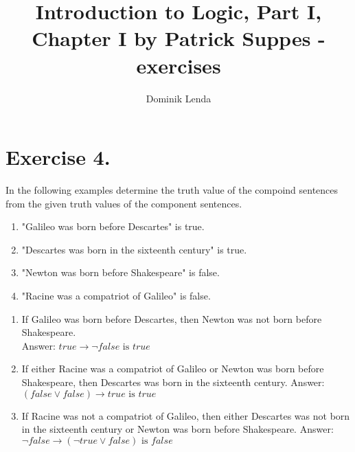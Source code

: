 \documentclass{article}
\title{Introduction to Logic, Part I, Chapter I by Patrick Suppes - exercises}
\author{Dominik Lenda}
\begin{document}
\maketitle

\section*{Exercise 4.}
In the following examples determine the truth value of the compoind sentences from the given truth values of the component sentences.
\medskip
\begin{enumerate}[label=(\roman*)]
    \item "Galileo was born before Descartes" is true.
    \item "Descartes was born in the sixteenth century" is true.
    \item "Newton was born before Shakespeare" is false.
    \item "Racine was a compatriot of Galileo" is false.
\end{enumerate}
\medskip
\begin{enumerate}[label=(\alph*)]
    \item If Galileo was born before Descartes, then Newton was not born before Shakespeare.\\
        Answer: $true \rightarrow \neg false \text{ is } true$
    \item If either Racine was a compatriot of Galileo or Newton was born before Shakespeare, then Descartes was born in the sixteenth century.
        Answer: $(false \vee false) \rightarrow true \text{ is } true$ 
    \item If Racine was not a compatriot of Galileo, then either Descartes was not born in the sixteenth century or Newton was born before Shakespeare.
        Answer: $\neg false \rightarrow (\neg true \vee false) \text{ is } false$
\end{enumerate}
\end{document}
